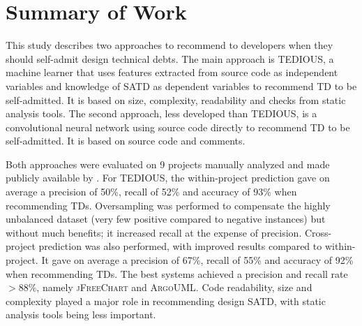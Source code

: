 \label{sec:Conclusion}





\section{Summary of Work}


This study describes two approaches to recommend to developers when they should self-admit design technical debts. The main approach is TEDIOUS, a machine learner that uses features extracted from source code as independent variables and knowledge of SATD as dependent variables to recommend TD to be self-admitted. It is based on size, complexity, readability and checks from static analysis tools. The second approach, less developed than TEDIOUS, is a convolutional neural network using source code directly to recommend TD to be self-admitted. It is based on source code and comments.

Both approaches were evaluated on 9 projects manually analyzed and made publicly available by \citet{maldonado17}. For TEDIOUS, the within-project prediction gave on average a precision of 50\%, recall of 52\% and accuracy of 93\% when recommending TDs. Oversampling was performed to compensate the highly unbalanced dataset (very few positive compared to negative instances) but without much benefits; it increased recall at the expense of precision. Cross-project prediction was also performed, with improved results compared to within-project. It gave on average a precision of 67\%, recall of 55\% and accuracy of 92\% when recommending TDs. The best systems achieved a precision and recall rate $> 88\%$, namely \textsc{jFreeChart} and \textsc{ArgoUML}. Code readability, size and complexity played a major role in recommending design SATD, with static analysis tools being less important.

